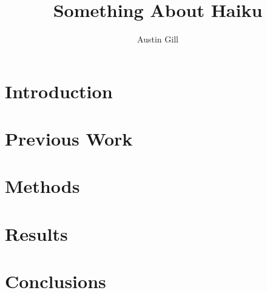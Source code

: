 \documentclass[12pt]{../sdsmt-thesis/thesis}
\title{Something About Haiku}
\author{Austin Gill}
\begin{document}
\maketitle

\makecopyright{}
\preliminaries{}

\begin{abstract}

\end{abstract}

\begin{acknowledgments}

\end{acknowledgments}

\tableofcontents
\listoftables
\listoffigures

\begin{preface}

\end{preface}

\body{}

\chapter{Introduction}
\chapter{Previous Work}
\chapter{Methods}
\chapter{Results}
\chapter{Conclusions}

\supplementaries{}


\begin{appendices}
\end{appendices}
\end{document}
